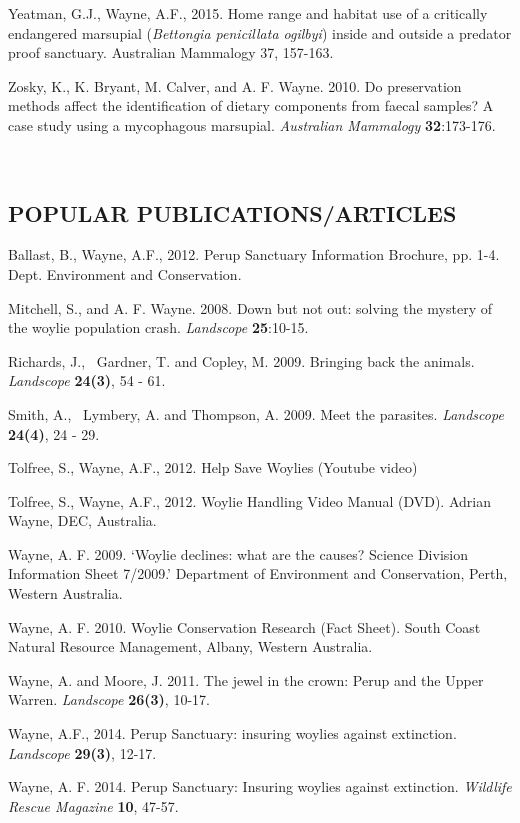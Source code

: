\documentclass[version=last,
    paper=a4,                               %
    10pt,                                   %
    dvipsnames,
    oneside,                              %
    headings=openany,                       %
    open=any,
    BCOR=7mm,                               %
    DIV=15,     %
]{scrbook}
\begin{document}
Yeatman, G.J., Wayne, A.F., 2015. Home range and habitat use of a
critically endangered marsupial (\emph{Bettongia penicillata ogilbyi})
inside and outside a predator proof sanctuary. Australian Mammalogy 37,
157-163.

Zosky, K., K. Bryant, M. Calver, and A. F. Wayne. 2010. Do preservation
methods affect the identification of dietary components from faecal
samples? A case study using a mycophagous marsupial. \emph{Australian
Mammalogy} \textbf{32}:173-176.

~

\subsection{POPULAR PUBLICATIONS/ARTICLES}

Ballast, B., Wayne, A.F., 2012. Perup Sanctuary Information Brochure,
pp. 1-4. Dept. Environment and Conservation.

Mitchell, S., and A. F. Wayne. 2008. Down but not out: solving the
mystery of the woylie population crash. \emph{Landscope}
\textbf{25}:10-15.

Richards, J.,~ Gardner, T. and Copley, M. 2009. Bringing back the
animals. \emph{Landscope} \textbf{24(3)}, 54 - 61.

Smith, A.,~ Lymbery, A. and Thompson, A. 2009. Meet the parasites.
\emph{Landscope} \textbf{24(4)}, 24 - 29.

Tolfree, S., Wayne, A.F., 2012. Help Save Woylies (Youtube video)

Tolfree, S., Wayne, A.F., 2012. Woylie Handling Video Manual (DVD).
Adrian Wayne, DEC, Australia.

Wayne, A. F. 2009. `Woylie declines: what are the causes? Science
Division Information Sheet 7/2009.' Department of Environment and
Conservation, Perth, Western Australia.

Wayne, A. F. 2010. Woylie Conservation Research (Fact Sheet). South
Coast Natural Resource Management, Albany, Western Australia.

Wayne, A. and Moore, J. 2011. The jewel in the crown: Perup and the
Upper Warren. \emph{Landscope} \textbf{26(3)}, 10-17.

Wayne, A.F., 2014. Perup Sanctuary: insuring woylies against extinction.
\emph{Landscope} \textbf{29(3)}, 12-17.

Wayne, A. F. 2014. Perup Sanctuary: Insuring woylies against extinction.
\emph{Wildlife Rescue Magazine} \textbf{10}, 47-57.

~
\end{document}
